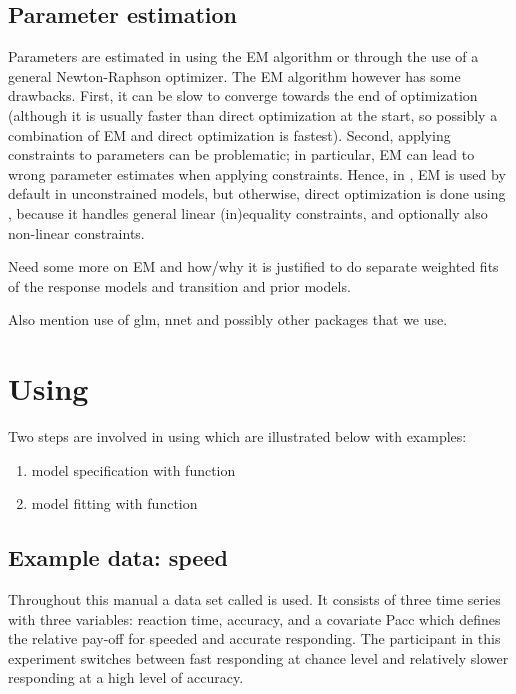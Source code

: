 \documentclass[article]{jss}
\begin{document}
\subsection{Parameter estimation}

Parameters are estimated in  using the EM algorithm or
through the use of a general Newton-Raphson optimizer.  The EM
algorithm however has some drawbacks.  First, it can be slow to
converge towards the end of optimization (although it is usually
faster than direct optimization at the start, so possibly a
combination of EM and direct optimization is fastest).  Second,
applying constraints to parameters can be problematic; in particular,
EM can lead to wrong parameter estimates when applying constraints.
Hence, in , EM is used by default in unconstrained
models, but otherwise, direct optimization is done using 
\cite{Tamura2007,Spellucci2002}, because it handles general linear
(in)equality constraints, and optionally also non-linear constraints.

Need some more on EM and how/why it is justified to do separate weighted
fits of the response models and transition and prior models. 

Also mention use of glm, nnet and possibly other packages that we use. 


\section{Using }

Two steps are involved in using  which are illustrated
below with examples:
\begin{enumerate}
	\item model specification with function 
	
	\item  model fitting with function 
\end{enumerate}

\subsection{Example data: speed}

Throughout this manual a data set called  is used.  It
consists of three time series with three variables: reaction time,
accuracy, and a covariate Pacc which defines the relative pay-off for
speeded and accurate responding. The participant in this experiment 
switches between fast responding at chance level and relatively 
slower responding at a high level of accuracy. 
\end{document}
